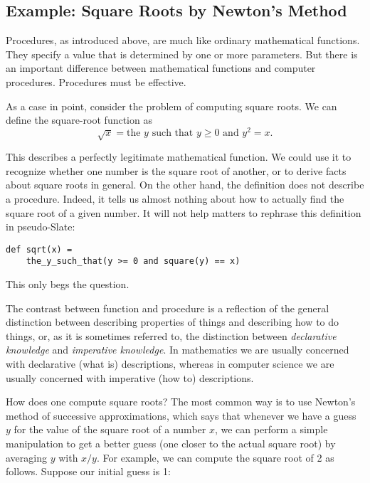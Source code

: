\subsection{Example: Square Roots by Newton's Method}

Procedures, as introduced above, are much like ordinary mathematical functions. They specify a value that is determined by one or more parameters. But there is an important difference between mathematical functions and computer procedures. Procedures must be effective.

As a case in point, consider the problem of computing square roots. We can define the square-root function as
\begin{equation}
\sqrt{x} = \text{the } y \text{ such that } y \geq 0 \text{ and } y^2 = x.
\end{equation}

This describes a perfectly legitimate mathematical function. We could use it to recognize whether one number is the square root of another, or to derive facts about square roots in general. On the other hand, the definition does not describe a procedure. Indeed, it tells us almost nothing about how to actually find the square root of a given number. It will not help matters to rephrase this definition in pseudo-Slate:

\begin{lstlisting}
def sqrt(x) =
    the_y_such_that(y >= 0 and square(y) == x)
\end{lstlisting}

This only begs the question.

The contrast between function and procedure is a reflection of the general distinction between describing properties of things and describing how to do things, or, as it is sometimes referred to, the distinction between \textit{declarative knowledge} and \textit{imperative knowledge}. In mathematics we are usually concerned with declarative (what is) descriptions, whereas in computer science we are usually concerned with imperative (how to) descriptions.

How does one compute square roots? The most common way is to use Newton's method of successive approximations, which says that whenever we have a guess $y$ for the value of the square root of a number $x$, we can perform a simple manipulation to get a better guess (one closer to the actual square root) by averaging $y$ with $x/y$. For example, we can compute the square root of 2 as follows. Suppose our initial guess is 1:

